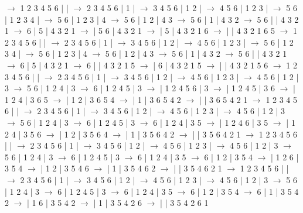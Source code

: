 \documentclass{article}
\begin{document}
\newline
 $\rightarrow$ 1 2 3 4 5 6 |  |  $\rightarrow$ 2 3 4 5 6 | 1 |  $\rightarrow$ 3 4 5 6 | 1 2 |  $\rightarrow$ 4 5 6 | 1 2 3 |  $\rightarrow$ 5 6 | 1 2 3 4 |  $\rightarrow$ 5 6 | 1 2 3 | 4 $\rightarrow$ 5 6 | 1 2 | 4 3 $\rightarrow$ 5 6 | 1 | 4 3 2 $\rightarrow$ 5 6 |  | 4 3 2 1 $\rightarrow$ 6 | 5 | 4 3 2 1 $\rightarrow$  | 5 6 | 4 3 2 1 $\rightarrow$  | 5 | 4 3 2 1 6 $\rightarrow$  |  | 4 3 2 1 6 5
\newline
 $\rightarrow$ 1 2 3 4 5 6 |  |  $\rightarrow$ 2 3 4 5 6 | 1 |  $\rightarrow$ 3 4 5 6 | 1 2 |  $\rightarrow$ 4 5 6 | 1 2 3 |  $\rightarrow$ 5 6 | 1 2 3 4 |  $\rightarrow$ 5 6 | 1 2 3 | 4 $\rightarrow$ 5 6 | 1 2 | 4 3 $\rightarrow$ 5 6 | 1 | 4 3 2 $\rightarrow$ 5 6 |  | 4 3 2 1 $\rightarrow$ 6 | 5 | 4 3 2 1 $\rightarrow$ 6 |  | 4 3 2 1 5 $\rightarrow$  | 6 | 4 3 2 1 5 $\rightarrow$  |  | 4 3 2 1 5 6
\newline
 $\rightarrow$ 1 2 3 4 5 6 |  |  $\rightarrow$ 2 3 4 5 6 | 1 |  $\rightarrow$ 3 4 5 6 | 1 2 |  $\rightarrow$ 4 5 6 | 1 2 3 |  $\rightarrow$ 4 5 6 | 1 2 | 3 $\rightarrow$ 5 6 | 1 2 4 | 3 $\rightarrow$ 6 | 1 2 4 5 | 3 $\rightarrow$  | 1 2 4 5 6 | 3 $\rightarrow$  | 1 2 4 5 | 3 6 $\rightarrow$  | 1 2 4 | 3 6 5 $\rightarrow$  | 1 2 | 3 6 5 4 $\rightarrow$  | 1 | 3 6 5 4 2 $\rightarrow$  |  | 3 6 5 4 2 1
\newline
 $\rightarrow$ 1 2 3 4 5 6 |  |  $\rightarrow$ 2 3 4 5 6 | 1 |  $\rightarrow$ 3 4 5 6 | 1 2 |  $\rightarrow$ 4 5 6 | 1 2 3 |  $\rightarrow$ 4 5 6 | 1 2 | 3 $\rightarrow$ 5 6 | 1 2 4 | 3 $\rightarrow$ 6 | 1 2 4 5 | 3 $\rightarrow$ 6 | 1 2 4 | 3 5 $\rightarrow$  | 1 2 4 6 | 3 5 $\rightarrow$  | 1 2 4 | 3 5 6 $\rightarrow$  | 1 2 | 3 5 6 4 $\rightarrow$  | 1 | 3 5 6 4 2 $\rightarrow$  |  | 3 5 6 4 2 1
\newline
 $\rightarrow$ 1 2 3 4 5 6 |  |  $\rightarrow$ 2 3 4 5 6 | 1 |  $\rightarrow$ 3 4 5 6 | 1 2 |  $\rightarrow$ 4 5 6 | 1 2 3 |  $\rightarrow$ 4 5 6 | 1 2 | 3 $\rightarrow$ 5 6 | 1 2 4 | 3 $\rightarrow$ 6 | 1 2 4 5 | 3 $\rightarrow$ 6 | 1 2 4 | 3 5 $\rightarrow$ 6 | 1 2 | 3 5 4 $\rightarrow$  | 1 2 6 | 3 5 4 $\rightarrow$  | 1 2 | 3 5 4 6 $\rightarrow$  | 1 | 3 5 4 6 2 $\rightarrow$  |  | 3 5 4 6 2 1
\newline
 $\rightarrow$ 1 2 3 4 5 6 |  |  $\rightarrow$ 2 3 4 5 6 | 1 |  $\rightarrow$ 3 4 5 6 | 1 2 |  $\rightarrow$ 4 5 6 | 1 2 3 |  $\rightarrow$ 4 5 6 | 1 2 | 3 $\rightarrow$ 5 6 | 1 2 4 | 3 $\rightarrow$ 6 | 1 2 4 5 | 3 $\rightarrow$ 6 | 1 2 4 | 3 5 $\rightarrow$ 6 | 1 2 | 3 5 4 $\rightarrow$ 6 | 1 | 3 5 4 2 $\rightarrow$  | 1 6 | 3 5 4 2 $\rightarrow$  | 1 | 3 5 4 2 6 $\rightarrow$  |  | 3 5 4 2 6 1
\end{document}

